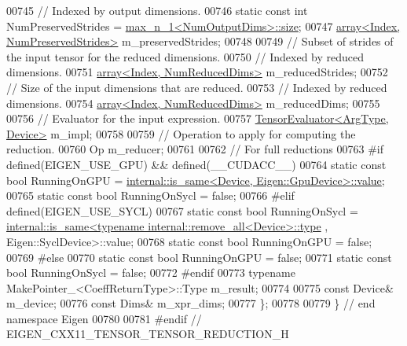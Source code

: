\begin{DoxyCode}
00745   \textcolor{comment}{// Indexed by output dimensions.}
00746   \textcolor{keyword}{static} \textcolor{keyword}{const} \textcolor{keywordtype}{int} NumPreservedStrides = \hyperlink{struct_eigen_1_1max__n__1}{max\_n\_1<NumOutputDims>::size};
00747   \hyperlink{class_eigen_1_1array}{array<Index, NumPreservedStrides>} m\_preservedStrides;
00748 
00749   \textcolor{comment}{// Subset of strides of the input tensor for the reduced dimensions.}
00750   \textcolor{comment}{// Indexed by reduced dimensions.}
00751   \hyperlink{class_eigen_1_1array}{array<Index, NumReducedDims>} m\_reducedStrides;
00752   \textcolor{comment}{// Size of the input dimensions that are reduced.}
00753   \textcolor{comment}{// Indexed by reduced dimensions.}
00754   \hyperlink{class_eigen_1_1array}{array<Index, NumReducedDims>} m\_reducedDims;
00755 
00756   \textcolor{comment}{// Evaluator for the input expression.}
00757   \hyperlink{struct_eigen_1_1_tensor_evaluator}{TensorEvaluator<ArgType, Device>} m\_impl;
00758 
00759   \textcolor{comment}{// Operation to apply for computing the reduction.}
00760   Op m\_reducer;
00761 
00762   \textcolor{comment}{// For full reductions}
00763 \textcolor{preprocessor}{#if defined(EIGEN\_USE\_GPU) && defined(\_\_CUDACC\_\_)}
00764   \textcolor{keyword}{static} \textcolor{keyword}{const} \textcolor{keywordtype}{bool} RunningOnGPU = 
      \hyperlink{struct_eigen_1_1internal_1_1is__same}{internal::is\_same<Device, Eigen::GpuDevice>::value};
00765   \textcolor{keyword}{static} \textcolor{keyword}{const} \textcolor{keywordtype}{bool} RunningOnSycl = \textcolor{keyword}{false};
00766 \textcolor{preprocessor}{#elif defined(EIGEN\_USE\_SYCL)}
00767 \textcolor{keyword}{static} \textcolor{keyword}{const} \textcolor{keywordtype}{bool} RunningOnSycl = 
      \hyperlink{struct_eigen_1_1internal_1_1is__same}{internal::is\_same<typename internal::remove\_all<Device>::type}
      , Eigen::SyclDevice>::value;
00768 \textcolor{keyword}{static} \textcolor{keyword}{const} \textcolor{keywordtype}{bool} RunningOnGPU = \textcolor{keyword}{false};
00769 \textcolor{preprocessor}{#else}
00770   \textcolor{keyword}{static} \textcolor{keyword}{const} \textcolor{keywordtype}{bool} RunningOnGPU = \textcolor{keyword}{false};
00771   \textcolor{keyword}{static} \textcolor{keyword}{const} \textcolor{keywordtype}{bool} RunningOnSycl = \textcolor{keyword}{false};
00772 \textcolor{preprocessor}{#endif}
00773   \textcolor{keyword}{typename} MakePointer\_<CoeffReturnType>::Type m\_result;
00774 
00775   \textcolor{keyword}{const} Device& m\_device;
00776   \textcolor{keyword}{const} Dims& m\_xpr\_dims;
00777 \};
00778 
00779 \} \textcolor{comment}{// end namespace Eigen}
00780 
00781 \textcolor{preprocessor}{#endif // EIGEN\_CXX11\_TENSOR\_TENSOR\_REDUCTION\_H}
\end{DoxyCode}
